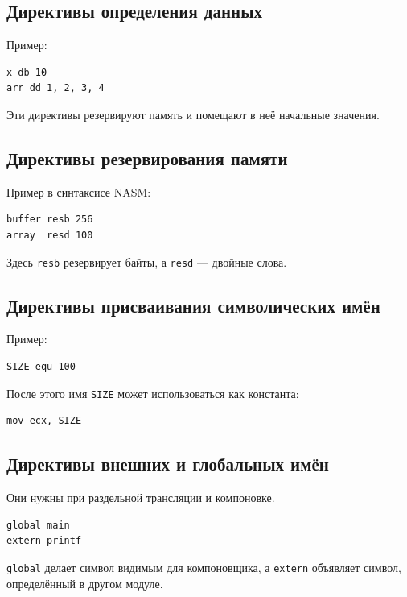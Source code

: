 \documentclass[12pt,a4paper]{article}
\begin{document}
\subsection{Директивы определения данных}

Пример:

\begin{lstlisting}
x db 10
arr dd 1, 2, 3, 4
\end{lstlisting}

Эти директивы резервируют память и помещают в неё начальные значения.

\subsection{Директивы резервирования памяти}

Пример в синтаксисе NASM:

\begin{lstlisting}
buffer resb 256
array  resd 100
\end{lstlisting}

Здесь \texttt{resb} резервирует байты, а \texttt{resd} --- двойные слова.

\subsection{Директивы присваивания символических имён}

Пример:

\begin{lstlisting}
SIZE equ 100
\end{lstlisting}

После этого имя \texttt{SIZE} может использоваться как константа:

\begin{lstlisting}
mov ecx, SIZE
\end{lstlisting}

\subsection{Директивы внешних и глобальных имён}

Они нужны при раздельной трансляции и компоновке.

\begin{lstlisting}
global main
extern printf
\end{lstlisting}

\texttt{global} делает символ видимым для компоновщика, а \texttt{extern} объявляет символ, определённый в другом модуле.
\end{document}
